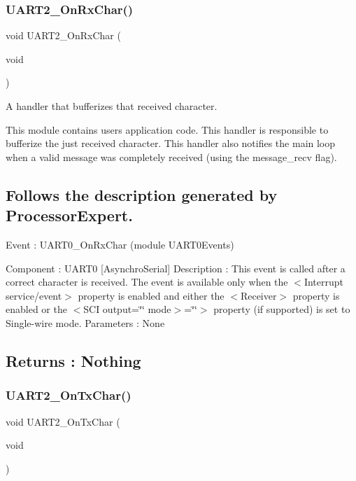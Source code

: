 \subsubsection{\texorpdfstring{U\+A\+R\+T2\+\_\+\+On\+Rx\+Char()}{UART2\_OnRxChar()}}
{\footnotesize\ttfamily void U\+A\+R\+T2\+\_\+\+On\+Rx\+Char (\begin{DoxyParamCaption}\item[{void}]{ }\end{DoxyParamCaption})}



A handler that bufferizes that received character. 

This module contains user\textquotesingle{}s application code. This handler is responsible to bufferize the just received character. This handler also notifies the main loop when a valid message was completely received (using the message\+\_\+recv flag).

\subsection*{Follows the description generated by Processor\+Expert. }

Event \+: U\+A\+R\+T0\+\_\+\+On\+Rx\+Char (module U\+A\+R\+T0\+Events)

Component \+: U\+A\+R\+T0 \mbox{[}Asynchro\+Serial\mbox{]} Description \+: This event is called after a correct character is received. The event is available only when the $<$Interrupt service/event$>$ property is enabled and either the $<$\+Receiver$>$ property is enabled or the $<$\+S\+C\+I output=\char`\"{}\char`\"{} mode$>$=\char`\"{}\char`\"{}$>$ property (if supported) is set to Single-\/wire mode. Parameters \+: None \subsection*{Returns \+: Nothing }\mbox{\label{group___u_a_r_t2_events__module_gac49d0823b6d0e433817f45c9df0a688e}} 
\subsubsection{\texorpdfstring{U\+A\+R\+T2\+\_\+\+On\+Tx\+Char()}{UART2\_OnTxChar()}}
{\footnotesize\ttfamily void U\+A\+R\+T2\+\_\+\+On\+Tx\+Char (\begin{DoxyParamCaption}\item[{void}]{ }\end{DoxyParamCaption})}



